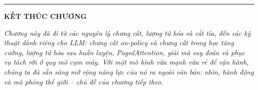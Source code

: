 \bigskip
\hrule
\bigskip

\begin{center}
    \textbf{\Large KẾT THÚC CHƯƠNG \thechapter}
\end{center}

\textit{Chương này đã đi từ các nguyên lý chưng cất, lượng tử hóa và cắt tỉa, đến các kỹ thuật dành riêng cho LLM: chưng cất on-policy và chưng cất trong học tăng cường, lượng tử hóa sau huấn luyện, PagedAttention, giải mã suy đoán và phục vụ tách rời ở quy mô cụm máy. Với một mô hình vừa mạnh vừa rẻ để vận hành, chúng ta đã sẵn sàng mở rộng năng lực của nó ra ngoài văn bản: nhìn, hành động và mô phỏng thế giới -- chủ đề của chương tiếp theo.}
